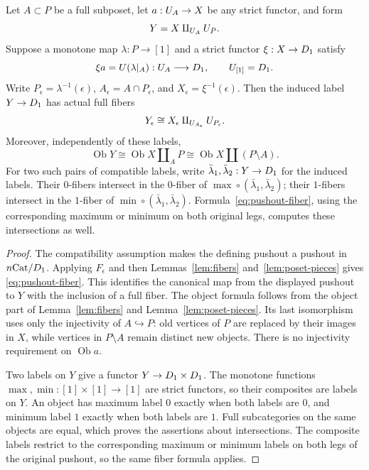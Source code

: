 \begin{proposition}\label{prop:labelled-pushout}
Let $A\subset P$ be a full subposet, let $a:U_{A}\to X$ be any strict
functor, and form
\[
 Y=X\amalg_{U_{A}}U_{P}.
\]
Suppose a monotone map $\lambda:P\to[1]$ and a strict functor
$\xi:X\to D_{1}$ satisfy
\[
 \xi a=U(\lambda|_A):U_{A}\longrightarrow D_{1},
 \qquad U_{[1]}=D_{1}.
\]
Write
$P_\epsilon=\lambda^{-1}(\epsilon)$,
$A_\epsilon=A\cap P_\epsilon$, and
$X_\epsilon=\xi^{-1}(\epsilon)$.  Then the induced label
$Y\to D_{1}$ has actual full fibers
\begin{equation}\label{eq:pushout-fiber}
 Y_\epsilon\cong
 X_\epsilon\amalg_{U_{A_\epsilon}}U_{P_\epsilon}.
\end{equation}
Moreover, independently of these labels,
\begin{equation}\label{eq:pushout-objects}
 \operatorname{Ob}Y\cong
 \operatorname{Ob}X\amalg_A P
 \cong\operatorname{Ob}X\amalg(P\setminus A).
\end{equation}
For two such pairs of compatible labels, write
$\bar\lambda_1,\bar\lambda_2:Y\to D_{1}$ for the induced labels.
Their $0$-fibers intersect in the $0$-fiber of
$\max\circ(\bar\lambda_1,\bar\lambda_2)$; their $1$-fibers intersect
in the $1$-fiber of $\min\circ(\bar\lambda_1,\bar\lambda_2)$.
Formula~\eqref{eq:pushout-fiber}, using the corresponding maximum or
minimum on both original legs, computes these intersections as well.
\end{proposition}

\begin{proof}
The compatibility assumption makes the defining pushout a pushout in
$n\mathrm{Cat}/D_{1}$.  Applying $F_\epsilon$ and then
Lemmas~\ref{lem:fibers} and~\ref{lem:poset-pieces} gives
\eqref{eq:pushout-fiber}.  This identifies the canonical map from
the displayed pushout to $Y$ with the inclusion of a full fiber.
The object formula follows from the object part of Lemma~\ref{lem:fibers}
and Lemma~\ref{lem:poset-pieces}.  Its last isomorphism uses only the
injectivity of $A\hookrightarrow P$: old vertices of $P$ are replaced
by their images in $X$, while vertices in $P\setminus A$ remain distinct
new objects.  There is no injectivity requirement on $\operatorname{Ob}a$.

Two labels on $Y$ give a functor
$Y\to D_{1}\times D_{1}$.  The monotone functions
$\max,\min:[1]\times[1]\to[1]$ are strict functors, so their
composites are labels on $Y$.  An object has maximum label $0$ exactly
when both labels are $0$, and minimum label $1$ exactly when both
labels are $1$.  Full subcategories on the same objects are equal,
which proves the assertions about intersections.  The composite
labels restrict to the corresponding maximum or minimum labels on
both legs of the original pushout, so the same fiber formula applies.
\end{proof}


